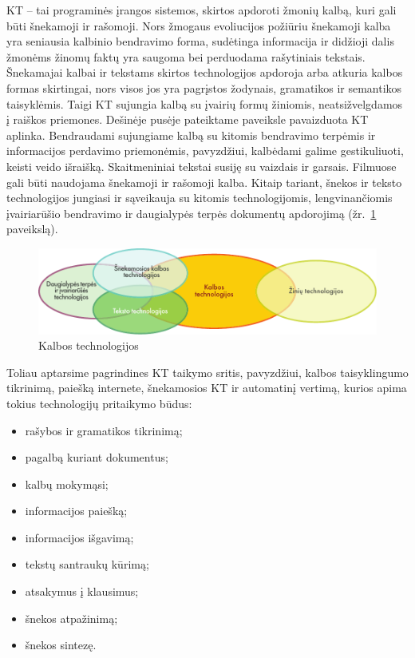

\begin{multicols}{2}

KT – tai programinės įrangos sistemos, skirtos apdoroti žmonių kalbą, kuri gali būti šnekamoji ir rašomoji. Nors žmogaus evoliucijos požiūriu šnekamoji kalba yra seniausia kalbinio bendravimo forma, sudėtinga informacija ir didžioji dalis žmonėms žinomų faktų yra saugoma bei perduodama rašytiniais tekstais. Šnekamajai kalbai ir tekstams skirtos technologijos apdoroja arba atkuria kalbos formas skirtingai, nors visos jos yra pagrįstos žodynais, gramatikos ir semantikos taisyklėmis. Taigi KT sujungia kalbą su įvairių formų žiniomis, neatsižvelgdamos į raiškos priemones. Dešinėje pusėje pateiktame paveiksle pavaizduota KT aplinka. Bendraudami sujungiame kalbą su kitomis bendravimo terpėmis ir informacijos perdavimo priemonėmis, pavyzdžiui, kalbėdami galime gestikuliuoti, keisti veido išraišką. Skaitmeniniai tekstai susiję su  vaizdais ir garsais. Filmuose gali būti naudojama šnekamoji ir rašomoji kalba. Kitaip tariant, šnekos ir teksto technologijos jungiasi ir sąveikauja su kitomis technologijomis, lengvinančiomis įvairiarūšio bendravimo ir daugialypės terpės dokumentų apdorojimą (žr.~\ref{fig:ltincontext_de} paveikslą).

\begin{figure}[htb]
  \center
  \includegraphics[width=\textwidth]{../_media/lithuanian/language_technologies}
  \caption{Kalbos technologijos}
  \label{fig:ltincontext_de}
\end{figure}

Toliau aptarsime pagrindines KT taikymo sritis, pavyzdžiui, kalbos taisyklingumo tikrinimą, paiešką internete, šnekamosios KT ir automatinį vertimą, kurios apima tokius technologijų pritaikymo būdus:

\begin{itemize}
\item  rašybos ir gramatikos tikrinimą;
\item pagalbą kuriant dokumentus;
\item kalbų mokymąsi;
\item  informacijos paiešką;
\item  informacijos išgavimą;
\item tekstų santraukų kūrimą;
\item atsakymus į klausimus;
\item šnekos atpažinimą; 
\item  šnekos sintezę.
\end{itemize}


\end{multicols}
